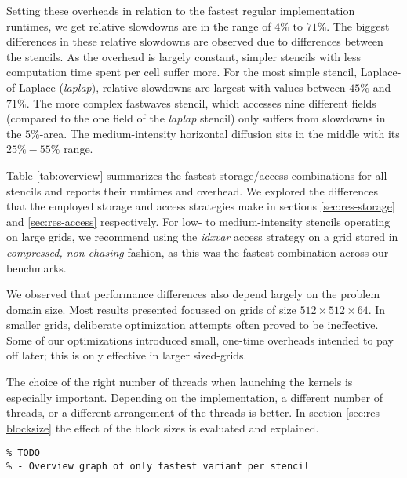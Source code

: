 Setting these overheads in relation to the fastest regular implementation runtimes, we get relative slowdowns are in the range of $4\%$ to $71\%$. The biggest differences in these relative slowdowns are observed due to differences between the stencils. As the overhead is largely constant, simpler stencils with less computation time spent per cell suffer more. For the most simple stencil, Laplace-of-Laplace (\emph{laplap}), relative slowdowns are largest with values between $45\%$ and $71\%$. The more complex fastwaves stencil, which accesses nine different fields (compared to the one field of the \emph{laplap} stencil) only suffers from slowdowns in the $5\%$-area. The medium-intensity horizontal diffusion sits in the middle with its $25\% - 55\%$ range. 

Table \ref{tab:overview} summarizes the fastest storage/access-combinations for all stencils and reports their runtimes and overhead. We explored the differences that the employed storage and access strategies make in sections \ref{sec:res-storage} and \ref{sec:res-access} respectively. For low- to medium-intensity stencils operating on large grids, we recommend using the \emph{idxvar} access strategy on a grid stored in \emph{compressed, non-chasing} fashion, as this was the fastest combination across our benchmarks. 

We observed that performance differences also depend largely on the problem domain size. Most results presented focussed on grids of size $512\times 512\times 64$. In smaller grids, deliberate optimization attempts often proved to be ineffective. Some of our optimizations introduced small, one-time overheads intended to pay off later; this is only effective in larger sized-grids.

The choice of the right number of threads when launching the kernels is especially important. Depending on the implementation, a different number of threads, or a different arrangement of the threads is better. In section \ref{sec:res-blocksize} the effect of the block sizes is evaluated and explained.

\begin{verbatim}
% TODO 
% - Overview graph of only fastest variant per stencil
\end{verbatim}

